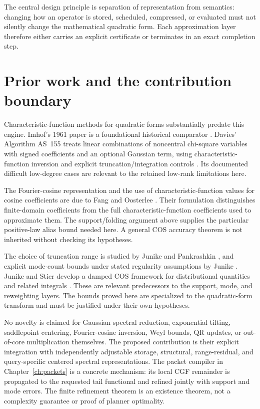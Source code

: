 The central design principle is separation of representation from semantics:
changing how an operator is stored, scheduled, compressed, or evaluated must
not silently change the mathematical quadratic form.  Each approximation
layer therefore either carries an explicit certificate or terminates in an
exact completion step.



\section{Prior work and the contribution boundary}\label{sec:prior-work}
Characteristic-function methods for quadratic forms substantially predate
this engine.  Imhof's 1961 paper is a foundational historical comparator
\cite{Imhof1961}.  Davies' Algorithm AS~155 treats linear combinations of
noncentral chi-square variables with signed coefficients and an optional
Gaussian term, using characteristic-function inversion and explicit
truncation/integration controls \cite{Davies1980}.  Its documented difficult
low-degree cases are relevant to the retained low-rank limitations here.

The Fourier-cosine representation and the use of characteristic-function
values for cosine coefficients are due to Fang and Oosterlee
\cite{FangOosterlee2008}.  Their formulation distinguishes finite-domain
coefficients from the full characteristic-function coefficients used to
approximate them.  The support/folding argument above supplies the particular
positive-law alias bound needed here. A general COS accuracy theorem is not
inherited without checking its hypotheses.

The choice of truncation range is studied by Junike and Pankrashkin
\cite{JunikePankrashkin2022}, and explicit mode-count bounds under stated
regularity assumptions by Junike \cite{Junike2024}. Junike and Stier develop
a damped COS framework for distributional quantities and related integrals
\cite{JunikeStier2025}. These are relevant predecessors to the support,
mode, and reweighting layers. The bounds proved here are specialized to the
quadratic-form transform and must be justified under their own hypotheses.

No novelty is claimed for Gaussian spectral reduction, exponential tilting,
saddlepoint centering, Fourier-cosine inversion, Weyl bounds, QR updates, or
out-of-core multiplication themselves.  The proposed contribution is their
explicit integration with independently adjustable storage, structural,
range-residual, and query-specific centered spectral representations.  The
packet compiler in Chapter~\ref{ch:packets} is a concrete mechanism: its
local CGF remainder is propagated to the requested tail functional and
refined jointly with support and mode errors.  The finite refinement theorem
is an existence theorem, not a complexity guarantee or proof of planner
optimality.

